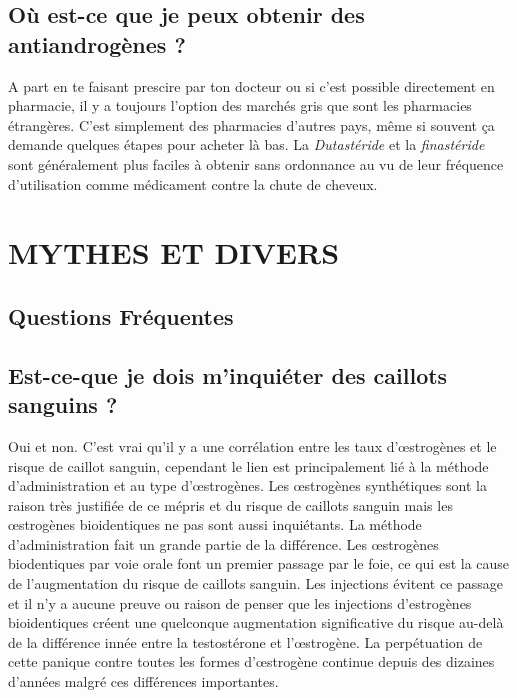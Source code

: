 \documentclass{article}
\begin{document}
\subsection{Où est-ce que je peux obtenir des antiandrogènes ?}

A part en te faisant prescire par ton docteur ou si c'est possible directement en pharmacie, il y a toujours l'option des marchés gris que sont les pharmacies étrangères. C'est simplement des pharmacies d'autres pays, même si souvent ça demande quelques étapes pour acheter là bas. La \textit{Dutastéride} et la \textit{finastéride} sont généralement plus faciles à obtenir sans ordonnance au vu de leur fréquence d'utilisation comme médicament contre la chute de cheveux.


\section{MYTHES ET DIVERS}\label{MM}


\subsection*{Questions Fréquentes}

\subsection{Est-ce-que je dois m'inquiéter des caillots sanguins ?}\label{11-1}

Oui et non. C'est vrai qu'il y a une corrélation entre les taux d'œstrogènes et le risque de caillot sanguin, cependant le lien est principalement lié à la méthode d'administration et au type d'œstrogènes. Les œstrogènes synthétiques sont la raison très justifiée de ce mépris et du risque de caillots sanguin mais les œstrogènes bioidentiques ne pas sont aussi inquiétants. La méthode d'administration fait un grande partie de la différence. Les œstrogènes biodentiques par voie orale font un premier passage par le foie, ce qui est la cause de l'augmentation du risque de caillots sanguin. Les injections évitent ce passage et il n'y a aucune preuve ou raison de penser que les injections d'estrogènes bioidentiques créent une quelconque augmentation significative du risque au-delà de la différence innée entre la testostérone et l'œstrogène. La perpétuation de cette panique contre toutes les formes d'œstrogène continue depuis des dizaines d'années malgré ces différences importantes.
\end{document}
